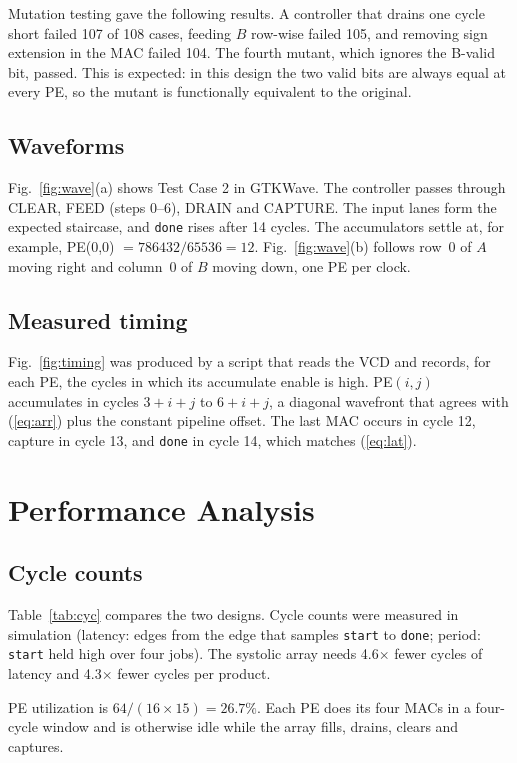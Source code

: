 \documentclass[conference]{IEEEtran}
\begin{document}
Mutation testing gave the following results. A controller that drains one cycle short failed 107 of 108 cases, feeding $B$ row-wise failed 105, and removing sign extension in the MAC failed 104. The fourth mutant, which ignores the B-valid bit, passed. This is expected: in this design the two valid bits are always equal at every PE, so the mutant is functionally equivalent to the original.

\subsection{Waveforms}
Fig.~\ref{fig:wave}(a) shows Test Case 2 in GTKWave. The controller passes through CLEAR, FEED (steps 0--6), DRAIN and CAPTURE. The input lanes form the expected staircase, and \texttt{done} rises after 14 cycles. The accumulators settle at, for example, PE(0,0) $= 786432/65536 = 12$. Fig.~\ref{fig:wave}(b) follows row~0 of $A$ moving right and column~0 of $B$ moving down, one PE per clock.



\subsection{Measured timing}
Fig.~\ref{fig:timing} was produced by a script that reads the VCD and records, for each PE, the cycles in which its accumulate enable is high. PE$(i,j)$ accumulates in cycles $3+i+j$ to $6+i+j$, a diagonal wavefront that agrees with (\ref{eq:arr}) plus the constant pipeline offset. The last MAC occurs in cycle 12, capture in cycle 13, and \texttt{done} in cycle 14, which matches (\ref{eq:lat}).


\section{Performance Analysis}
\label{sec:perf}
\subsection{Cycle counts}
Table~\ref{tab:cyc} compares the two designs. Cycle counts were measured in simulation (latency: edges from the edge that samples \texttt{start} to \texttt{done}; period: \texttt{start} held high over four jobs). The systolic array needs 4.6$\times$ fewer cycles of latency and 4.3$\times$ fewer cycles per product.

PE utilization is $64 / (16 \times 15) = 26.7\%$. Each PE does its four MACs in a four-cycle window and is otherwise idle while the array fills, drains, clears and captures.
\end{document}
